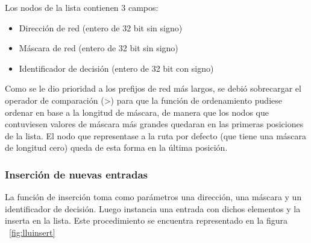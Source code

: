Los nodos de la lista contienen 3 campos:

\begin{itemize}
	\item Dirección de red (entero de 32 bit sin signo)
	\item Máscara de red (entero de 32 bit sin signo)
	\item Identificador de decisión (entero de 32 bit con signo)
\end{itemize}

Como se le dio prioridad a los prefijos de red más largos, se debió sobrecargar el operador de comparación (\textgreater) para que la función de ordenamiento pudiese ordenar en base a la longitud de máscara, de manera que los nodos que contuviesen valores de máscara más grandes quedaran en las primeras posiciones de la lista. El nodo que representase a la ruta por defecto (que tiene una máscara de longitud cero) queda de esta forma en la última posición.

\subsubsection{Inserción de nuevas entradas}

La función de inserción toma como parámetros una dirección, una máscara y un identificador de decisión. Luego instancia una entrada con dichos elementos y la inserta en la lista. Este procedimiento se encuentra representado en la figura ~\ref{fig:lluinsert}

